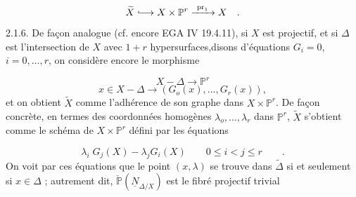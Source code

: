 \begin{equation*}
\widetilde{X} \lhook\joinrel\longrightarrow X \times \mathbb{P}^r \xrightarrow{\ \mathrm{pr}_1\ } X \quad .
\end{equation*}
2.1.6. De façon analogue (cf. encore EGA IV 19.4.11), si $X$ est projectif, et si $\Delta$ est l'intersection de $X$ avec $1 + r$ hypersurfaces,disons d'équations $G_i = 0$, $i = 0,\ldots,r$, on considère encore le morphisme

\begin{equation*}
X - \Delta \longrightarrow \mathbb{P}^r
\end{equation*}
\begin{equation*}
x \in X- \Delta \longrightarrow (G_o(x),\ldots,G_r(x)),
\end{equation*}
et on obtient $\widetilde{X}$ comme l'adhérence de son graphe dans $X \times \mathbb{P}^r$. De façon
concrète, en termes des coordonnées homogènes $\lambda_o,\ldots,\lambda_r$ dans $\mathbb{P}^r$, $\widetilde{X}$ s'obtient comme le schéma de $X \times \mathbb{P}^r$ défini par les équations

\begin{equation}\tag{2.1.6.1}
\lambda_i \; G_j(X) - \lambda_j G_i(X) \qquad 0 \leq i < j \leq r \qquad .
\end{equation}
On voit par ces équations que le point $(x,\lambda)$ se trouve dans $\widetilde{\Delta}$ si et seulement si $x \in \Delta$ ; autrement dit, $\check{\mathbb{P}} (\underline{N}_{\Delta/X})$ est le fibré projectif trivial

